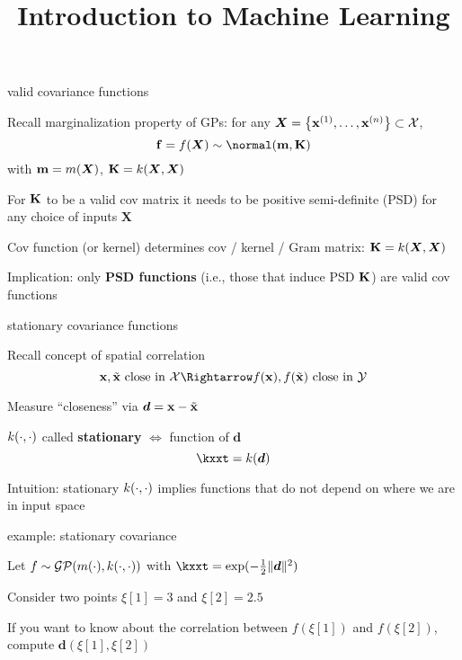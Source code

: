 \documentclass[11pt,compress,t,notes=noshow, xcolor=table]{beamer}
\title{Introduction to Machine Learning}
\begin{document}

\begin{framei}[sep=L]{valid covariance functions}
\item Recall marginalization property of GPs: for any $\bm{X} = \left\{ \mathbf{x}^{(1)}, \ldots, \mathbf{x}^{(n)}\right\} \subset \mathcal{X}$,
$$\fv = \fX \sim \Nmk$$
with $\mathbf{m} = m(\bm{X})$, $\mathbf{K} = k(\bm{X}, \bm{X})$
\item For $\mathbf{K}$ to be a valid cov matrix it needs to be positive semi-definite (PSD) for any choice of inputs $\bm{X}$
\item Cov function (or kernel) determines cov / kernel / Gram matrix: $\mathbf{K} = k(\bm{X}, \bm{X})$
\item Implication: only \textbf{PSD functions} (i.e., those that induce PSD $\mathbf{K}$) are valid cov functions 
\end{framei}

\begin{framei}[sep=L]{stationary covariance functions}
\item Recall concept of spatial correlation
$$\xv, \xtil \text{ close in } \Xspace \Rightarrow \fx, f(\xtil) \text{ close in } \Yspace$$
\item Measure ``closeness'' via $\bm{d} = \mathbf{x} - \tilde{\mathbf{x}}$
\item $k(\cdot, \cdot)$ called \textbf{stationary} $\Leftrightarrow$ function of $\bm{d}$ 
$$\kxxt = k(\bm{d})$$
\item Intuition: stationary $k(\cdot, \cdot)$ implies functions that do not depend on where we are in input space
\end{framei}

\begin{framei}{example: stationary covariance}
\item Let $f \sim \mathcal{GP}(m(\cdot), k(\cdot, \cdot))$ with $\kxxt = \exp(-\tfrac{1}{2}\|\bm{d}\|^2)$
\item Consider two points $\xi[1] = 3$ and $\xi[2] = 2.5$
\item If you want to know about the correlation between $f(\xi[1])$ and $f(\xi[2])$, compute $\bm{d}(\xi[1], \xi[2])$
\vfill
{}
\end{framei}
\end{document}

